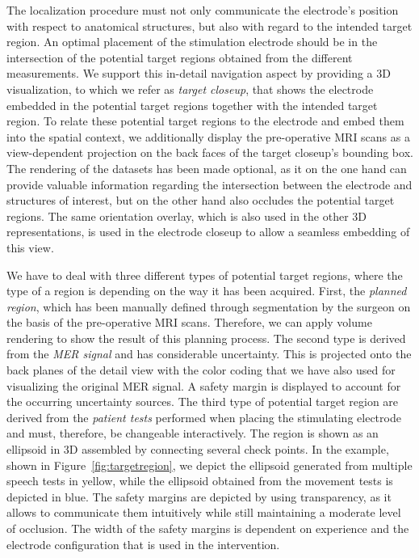 \documentclass[review]{vgtc}                 %
\begin{document}
The localization procedure must not only communicate the electrode's position with respect to anatomical structures, but also with regard to the intended target region. An optimal placement of the stimulation electrode should be in the intersection of the potential target regions obtained from the different measurements. We support this in-detail navigation aspect by providing a 3D visualization, to which we refer as \emph{target closeup}, that shows the electrode embedded in the potential target regions together with the intended target region. To relate these potential target regions to the electrode and embed them into the spatial context, we additionally display the pre-operative MRI scans as a view-dependent projection on the back faces of the target closeup's bounding box. The rendering of the datasets has been made optional, as it on the one hand can provide valuable information regarding the intersection between the electrode and structures of interest, but on the other hand also occludes the potential target regions. The same orientation overlay, which is also used in the other 3D representations, is used in the electrode closeup to allow a seamless embedding of this view.

We have to deal with three different types of potential target regions, where the type of a region is depending on the way it has been acquired. First, the \emph{planned region}, which has been manually defined through segmentation by the surgeon on the basis of the pre-operative MRI scans. Therefore, we can apply volume rendering to show the result of this planning process. The second type is derived from the \emph{MER signal} and has considerable uncertainty. This is projected onto the back planes of the detail view with the color coding that we have also used for visualizing the original MER signal. A safety margin is displayed to account for the occurring uncertainty sources. The third type of potential target region are derived from the \emph{patient tests} performed when placing the stimulating electrode and must, therefore, be changeable interactively. The region is shown as an ellipsoid in 3D assembled by connecting several check points. In the example, shown in Figure~\ref{fig:targetregion}, we depict the ellipsoid generated from multiple speech tests in yellow, while the ellipsoid obtained from the movement tests is depicted in blue. The safety margins are depicted by using transparency, as it allows to communicate them intuitively while still maintaining a moderate level of occlusion. The width of the safety margins is dependent on experience and the electrode configuration that is used in the intervention.
\end{document}
